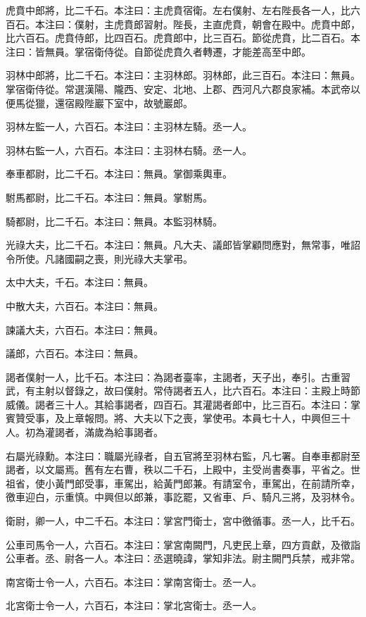 \begin{pinyinscope}
虎賁中郎將，比二千石。本注曰：主虎賁宿衛。左右僕射、左右陛長各一人，比六百石。本注曰：僕射，主虎賁郎習射。陛長，主直虎賁，朝會在殿中。虎賁中郎，比六百石。虎賁侍郎，比四百石。虎賁郎中，比三百石。節從虎賁，比二百石。本注曰：皆無員。掌宿衛侍從。自節從虎賁久者轉遷，才能差高至中郎。

羽林中郎將，比二千石。本注曰：主羽林郎。羽林郎，此三百石。本注曰：無員。掌宿衛侍從。常選漢陽、隴西、安定、北地、上郡、西河凡六郡良家補。本武帝以便馬從獵，還宿殿陛巖下室中，故號巖郎。

羽林左監一人，六百石。本注曰：主羽林左騎。丞一人。

羽林右監一人，六百石。本注曰：主羽林右騎。丞一人。

奉車都尉，比二千石。本注曰：無員。掌御乘輿車。

駙馬都尉，比二千石。本注曰：無員。掌駙馬。

騎都尉，比二千石。本注曰：無員。本監羽林騎。

光祿大夫，比二千石。本注曰：無員。凡大夫、議郎皆掌顧問應對，無常事，唯詔令所使。凡諸國嗣之喪，則光祿大夫掌弔。

太中大夫，千石。本注曰：無員。

中散大夫，六百石。本注曰：無員。

諫議大夫，六百石。本注曰：無員。

議郎，六百石。本注曰：無員。

謁者僕射一人，比千石。本注曰：為謁者臺率，主謁者，天子出，奉引。古重習武，有主射以督錄之，故曰僕射。常侍謁者五人，比六百石。本注曰：主殿上時節威儀。謁者三十人。其給事謁者，四百石。其灌謁者郎中，比三百石。本注曰：掌賓贊受事，及上章報問。將、大夫以下之喪，掌使弔。本員七十人，中興但三十人。初為灌謁者，滿歲為給事謁者。

右屬光祿勳。本注曰：職屬光祿者，自五官將至羽林右監，凡七署。自奉車都尉至謁者，以文屬焉。舊有左右曹，秩以二千石，上殿中，主受尚書奏事，平省之。世祖省，使小黃門郎受事，車駕出，給黃門郎兼。有請室令，車駕出，在前請所幸，徼車迎白，示重慎。中興但以郎兼，事訖罷，又省車、戶、騎凡三將，及羽林令。

衛尉，卿一人，中二千石。本注曰：掌宮門衛士，宮中徼循事。丞一人，比千石。

公車司馬令一人，六百石。本注曰：掌宮南闕門，凡吏民上章，四方貢獻，及徵詣公車者。丞、尉各一人。本注曰：丞選曉諱，掌知非法。尉主闕門兵禁，戒非常。

南宮衛士令一人，六百石。本注曰：掌南宮衛士。丞一人。

北宮衛士令一人，六百石，本注曰：掌北宮衛士。丞一人。


\end{pinyinscope}
